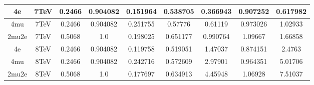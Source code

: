 \begin{table}[b]
\begin{tabular}{c c c c c c c c c}
4e & 7TeV & 0.2466 & 0.904082 & 0.151964 & 0.538705
 & 0.366943%
 & 0.907252 & 0.617982 \\ \hline 4mu & 7TeV & 0.2466 & 0.904082 & 0.251755 & 0.57776
 & 0.61119%
 & 0.973026 & 1.02933 \\ \hline 2mu2e & 7TeV & 0.5068 & 1.0  & 0.198025 & 0.651177
 & 0.990764%
 & 1.09667 & 1.66858 \\ \hline \hline 
4e & 8TeV & 0.2466 & 0.904082 & 0.119758 & 0.519051
 & 1.47037%
 & 0.874151 & 2.4763 \\ \hline 4mu & 8TeV & 0.2466 & 0.904082 & 0.242716 & 0.572609
 & 2.97901%
 & 0.964351 & 5.01706 \\ \hline 2mu2e & 8TeV & 0.5068 & 1.0  & 0.177697 & 0.634913
 & 4.45948%
 & 1.06928 & 7.51037 \\ \hline \hline 
\end{tabular}
\label{table:HZZ4lyieldcorr_spin1}
\end{table}


